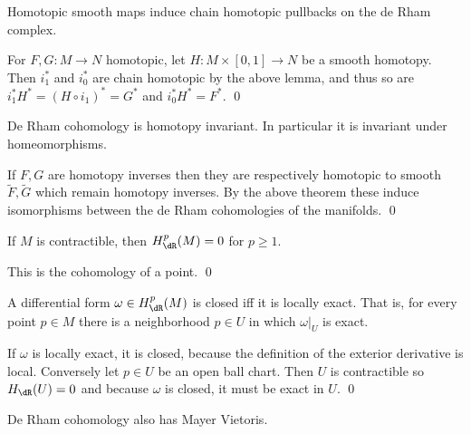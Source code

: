 \eproof

\bthrm

    Homotopic smooth maps induce chain homotopic pullbacks on the de Rham complex.

\ethrm

\bproof

    For $F,G\colon M\to N$ homotopic, let $H\colon M\times[0,1]\to N$ be a smooth homotopy.
    Then $i_1^*$ and $i_0^*$ are chain homotopic by the above lemma, and thus so are $i_1^*H^*=(H\circ i_1)^*=G^*$ and
    $i_0^*H^*=F^*$.
    \qed

\eproof

\bcoro

    De Rham cohomology is homotopy invariant.
    In particular it is invariant under homeomorphisms.

\ecoro

\bproof

    If $F,G$ are homotopy inverses then they are respectively homotopic to smooth $\tilde F,\tilde G$ which remain
    homotopy inverses.
    By the above theorem these induce isomorphisms between the de Rham cohomologies of the manifolds.
    \qed

\eproof

\bcoro

    If $M$ is contractible, then $H^p_\dR(M)=0$ for $p\geq1$.

\ecoro

\bproof

    This is the cohomology of a point.
    \qed

\eproof

\bthrm[title={Poincare's lemma}, name={poincarelemm}]

    A differential form $\omega\in H^p_\dR(M)$ is closed iff it is locally exact.
    That is, for every point $p\in M$ there is a neighborhood $p\in U$ in which $\omega|_U$ is exact.

\ethrm

\bproof

    If $\omega$ is locally exact, it is closed, because the definition of the exterior derivative is local.
    Conversely let $p\in U$ be an open ball chart.
    Then $U$ is contractible so $H_\dR(U)=0$ and because $\omega$ is closed, it must be exact in $U$.
    \qed

\eproof

De Rham cohomology also has Mayer Vietoris.

\bthrm[title={Mayer-Vietoris}, name={mayerviet}]

